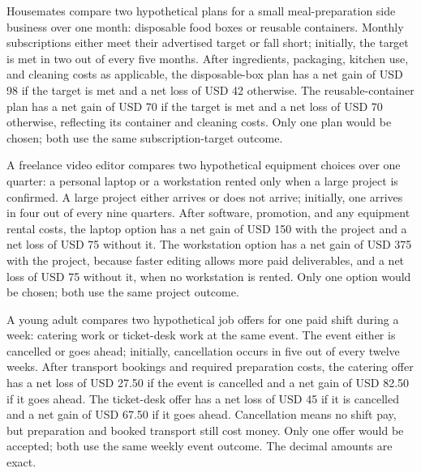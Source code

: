 Housemates compare two hypothetical plans for a small meal-preparation side business over
one month: disposable food boxes or reusable containers. Monthly subscriptions either
meet their advertised target or fall short; initially, the target is met in two out of
every five months. After ingredients, packaging, kitchen use, and cleaning costs as
applicable, the disposable-box plan has a net gain of USD 98 if the target is met and a
net loss of USD 42 otherwise. The reusable-container plan has a net gain of USD 70 if the
target is met and a net loss of USD 70 otherwise, reflecting its container and cleaning
costs. Only one plan would be chosen; both use the same subscription-target outcome.

A freelance video editor compares two hypothetical equipment choices over one quarter:
a personal laptop or a workstation rented only when a large project is confirmed.
A large project either arrives or does not arrive; initially, one arrives in four out
of every nine quarters. After software, promotion, and any equipment rental costs, the
laptop option has a net gain of USD 150 with the project and a net loss of USD 75 without
it. The workstation option has a net gain of USD 375 with the project, because faster
editing allows more paid deliverables, and a net loss of USD 75 without it, when no
workstation is rented. Only one option would be chosen; both use the same project outcome.

A young adult compares two hypothetical job offers for one paid shift during a week:
catering work or ticket-desk work at the same event. The event either is cancelled or
goes ahead; initially, cancellation occurs in five out of every twelve weeks. After
transport bookings and required preparation costs, the catering offer has a net loss of
USD 27.50 if the event is cancelled and a net gain of USD 82.50 if it goes ahead. The
ticket-desk offer has a net loss of USD 45 if it is cancelled and a net gain of USD 67.50
if it goes ahead. Cancellation means no shift pay, but preparation and booked transport
still cost money. Only one offer would be accepted; both use the same weekly event outcome.
The decimal amounts are exact.

